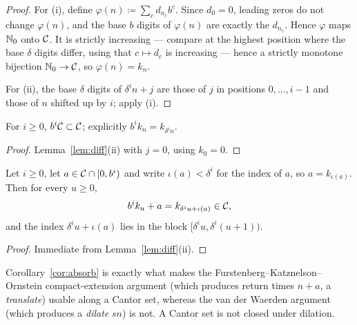 \begin{proof}
  \leanok
  For (i), define $\varphi(n) \coloneqq \sum_c d_{n_c} b^c$.  Since $d_0 = 0$, leading zeros do
  not change $\varphi(n)$, and the base $b$ digits of $\varphi(n)$ are exactly the $d_{n_c}$.
  Hence $\varphi$ maps $\mathbb{N}_0$ onto $\mathcal{C}$.  It is strictly increasing --- compare at the
  highest position where the base $\delta$ digits differ, using that $c \mapsto d_c$ is
  increasing --- hence a strictly monotone bijection $\mathbb{N}_0 \to \mathcal{C}$, so $\varphi(n) = k_n$.

  For (ii), the base $\delta$ digits of $\delta^i n + j$ are those of $j$ in positions
  $0,\dots,i-1$ and those of $n$ shifted up by $i$; apply (i).
\end{proof}

\begin{corollary}
  \label{cor:self-similar}
  \leanok
  For $i \geq 0$, $b^i \mathcal{C} \subset \mathcal{C}$; explicitly $b^i k_n = k_{\delta^i n}$.
\end{corollary}

\begin{proof}
  \leanok
  Lemma~\ref{lem:diff}(ii) with $j = 0$, using $k_0 = 0$.
\end{proof}

\begin{corollary}
  \label{cor:absorb}
  \leanok
  Let $i \geq 0$, let $a \in \mathcal{C} \cap [0, b^i)$ and write $\iota(a) < \delta^i$ for the
  index of $a$, so $a = k_{\iota(a)}$.  Then for every $u \geq 0$,
  \begin{equation}
    \label{eq:absorb}
    b^i k_u + a = k_{\delta^i u + \iota(a)} \in \mathcal{C} ,
  \end{equation}
  and the index $\delta^i u + \iota(a)$ lies in the block $[\delta^i u, \delta^i(u+1))$.
\end{corollary}

\begin{proof}
  \leanok
  Immediate from Lemma~\ref{lem:diff}(ii).
\end{proof}

\begin{remark}
  Corollary~\ref{cor:absorb} is exactly what makes the Furstenberg--Katznelson--Ornstein
  compact-extension argument (which produces return times $n + a$, a \emph{translate}) usable
  along a Cantor set, whereas the van der Waerden argument (which produces a \emph{dilate} $sn$)
  is not.  A Cantor set is not closed under dilation.
\end{remark}


